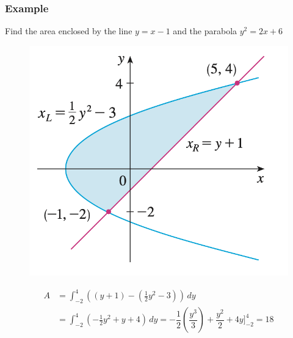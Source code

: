 \documentclass[t]{beamer}
\theoremstyle{plain}
\theoremstyle{definition}
\begin{document}
\begin{frame}

\frametitle{Example}
\footnotesize
Find the area enclosed by the line $y = x - 1$ and the parabola
$y^2 = 2x + 6$

\vspace{-0.5em}
\begin{figure}[t]
\begin{center}
\includegraphics[scale=0.4]{fig/area3}
\end{center}
\end{figure}

\vspace{-2em}

\begin{align*}
A &= \int_{-2}^{4} ((y + 1) - (\frac{1}{2}y^2 - 3)) \, dy \\
   &= \int_{-2}^{4} (-\frac{1}{2}y^2 + y + 4) \,dy = -\dfrac{1}{2}(\dfrac{y^3}{3}) + \dfrac{y^2}{2} + 4y\big]_{-2}^{4} = 18
\end{align*}

\end{frame}
\end{document}

